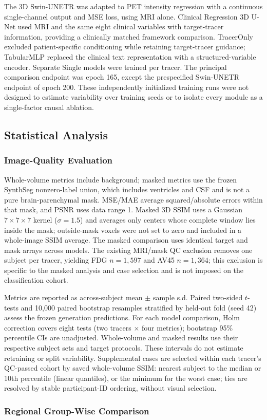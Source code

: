 \documentclass{article}
\providecommand{\DIFaddtex}[1]{{\protect\color{blue} \sf #1}} %
\providecommand{\DIFaddbegin}{} %
\providecommand{\DIFaddend}{} %
\providecommand{\DIFadd}[1]{\texorpdfstring{\DIFaddtex{#1}}{#1}} %
\newcommand{\DIFaddincludegraphics}[2][]{{\color{blue}\fbox{\DIFOincludegraphics[#1]{#2}}}} %
\DeclareRobustCommand{\DIFaddbegin}{\DIFOaddbegin \let\includegraphics\DIFaddincludegraphics} %
\DeclareRobustCommand{\DIFaddend}{\DIFOaddend \let\includegraphics\DIFOincludegraphics} %
\begin{document}
\DIFaddbegin \DIFadd{The 3D Swin-UNETR was adapted to PET intensity regression with a continuous single-channel output and MSE loss, using MRI alone. Clinical Regression 3D U-Net used MRI and the same eight clinical variables with target-tracer information, providing a clinically matched framework comparison. TracerOnly excluded patient-specific conditioning while retaining target-tracer guidance; TabularMLP replaced the clinical text representation with a structured-variable encoder. Separate Single models were trained per tracer. The principal comparison endpoint was epoch 165, except the prespecified Swin-UNETR endpoint of epoch 200. These independently initialized training runs were not designed to estimate variability over training seeds or to isolate every module as a single-factor causal ablation.
}

\DIFaddend \subsection{Statistical Analysis}
\DIFaddbegin \subsubsection{\texorpdfstring{\DIFadd{Image-Quality Evaluation}}{Image-Quality Evaluation}}
\DIFadd{Whole-volume metrics include background; masked metrics use the frozen SynthSeg nonzero-label union, which includes ventricles and CSF and is not a pure brain-parenchymal mask. MSE/MAE average squared/absolute errors within that mask, and PSNR uses data range 1. Masked 3D SSIM uses a Gaussian $7\times7\times7$ kernel ($\sigma=1.5$) and averages only centers whose complete window lies inside the mask; outside-mask voxels were not set to zero and included in a whole-image SSIM average. The masked comparison uses identical target and mask arrays across models. The existing MRI/mask QC exclusion removes one subject per tracer, yielding FDG $n=1,597$ and AV45 $n=1,364$; this exclusion is specific to the masked analysis and case selection and is not imposed on the classification cohort.
}

\DIFadd{Metrics are reported as across-subject mean $\pm$ sample s.d. Paired two-sided $t$-tests and 10,000 paired bootstrap resamples stratified by held-out fold (seed 42) assess the frozen generation predictions. For each model comparison, Holm correction covers eight tests (two tracers $\times$ four metrics); bootstrap 95\% percentile CIs are unadjusted. Whole-volume and masked results use their respective subject sets and target protocols. These intervals do not estimate retraining or split variability. Supplemental cases are selected within each tracer's QC-passed cohort by saved whole-volume SSIM: nearest subject to the median or 10th percentile (linear quantiles), or the minimum for the worst case; ties are resolved by stable participant-ID ordering, without visual selection.
}\DIFaddend \subsubsection{Regional Group-Wise Comparison}
\end{document}

